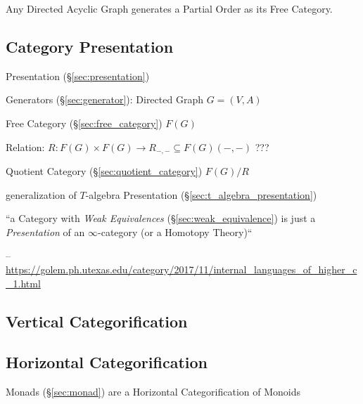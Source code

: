 Any Directed Acyclic Graph generates a Partial Order as its Free
Category.



\subsection{Category Presentation}\label{sec:category_presentation}

Presentation (\S\ref{sec:presentation})

Generators (\S\ref{sec:generator}): Directed Graph $G = (V,A)$

Free Category (\S\ref{sec:free_category}) $F(G)$

Relation: $R : F(G) \times F(G) \rightarrow R_{-,-} \subseteq
F(G)(-,-)$ ??? %

Quotient Category (\S\ref{sec:quotient_category}) $F(G) / R$

generalization of $T$-algebra Presentation
(\S\ref{sec:t_algebra_presentation})

``a Category with \emph{Weak Equivalences} (\S\ref{sec:weak_equivalence}) is
just a \emph{Presentation} of an $\infty$-category (or a Homotopy Theory)``

--\url{https://golem.ph.utexas.edu/category/2017/11/internal_languages_of_higher_c_1.html}



\subsection{Vertical Categorification}
\label{sec:vertical_categorification}

\subsection{Horizontal Categorification}
\label{sec:horizontal_categorification}

Monads (\S\ref{sec:monad}) are a Horizontal Categorification of
Monoids



